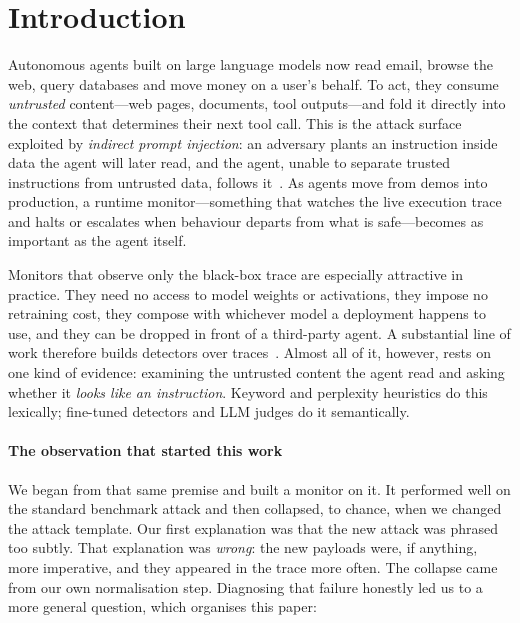 \documentclass[pdflatex,sn-basic]{sn-jnl}%
\theoremstyle{thmstyleone}
\theoremstyle{thmstyletwo}
\theoremstyle{thmstylethree}
\begin{document}

\maketitle


\section{Introduction}\label{sec:intro}

Autonomous agents built on large language models now read email, browse the web,
query databases and move money on a user's behalf. To act, they consume
\emph{untrusted} content---web pages, documents, tool outputs---and fold it
directly into the context that determines their next tool call. This is the
attack surface exploited by \emph{indirect prompt injection}: an adversary plants
an instruction inside data the agent will later read, and the agent, unable to
separate trusted instructions from untrusted data, follows
it~\citep{zhan2024injecagent,debenedetti2024agentdojo}. As agents move from demos
into production, a runtime monitor---something that watches the live execution
trace and halts or escalates when behaviour departs from what is safe---becomes
as important as the agent itself.

Monitors that observe only the black-box trace are especially attractive in
practice. They need no access to model weights or activations, they impose no
retraining cost, they compose with whichever model a deployment happens to use,
and they can be dropped in front of a third-party agent. A substantial line of
work therefore builds detectors over traces~\citep{wang2025agentarmor,
liu2025datasentinel,jia2024taskshield}. Almost all of it, however, rests on one
kind of evidence: examining the untrusted content the agent read and asking
whether it \emph{looks like an instruction}. Keyword and perplexity heuristics do
this lexically; fine-tuned detectors and LLM judges do it semantically.

\paragraph{The observation that started this work} We began from that same
premise and built a monitor on it. It performed well on the standard benchmark
attack and then collapsed, to chance, when we changed the attack template. Our
first explanation was that the new attack was phrased too subtly. That
explanation was \emph{wrong}: the new payloads were, if anything, more
imperative, and they appeared in the trace more often. The collapse came from our
own normalisation step. Diagnosing that failure honestly led us to a more
general question, which organises this paper:
\end{document}
